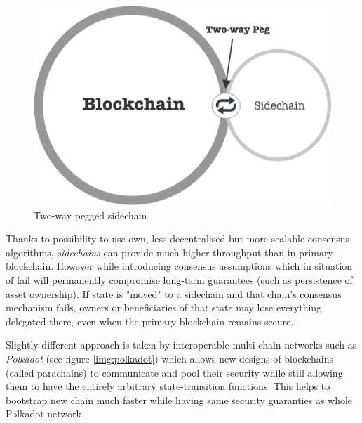 \documentclass[a4paper,12pt]{article}
\begin{document}
\begin{figure}[H]
    \centering
    \includegraphics[scale=0.5]{../img/sidechain}
    \caption{Two-way pegged sidechain}
    \label{img:sidechain}
\end{figure}

Thanks to possibility to use own, less decentralised but more scalable consensus
algorithms, \textit{sidechains} can provide much higher throughput than in 
primary blockchain. However while introducing consensus assumptions which in 
situation of fail will permanently compromise long-term guarantees (such as 
persistence of asset ownership). If state is "moved" to a sidechain and that 
chain's consensus mechanism fails, owners or beneficiaries of that state may 
lose everything delegated there, even when the primary blockchain remains
secure.

Slightly different approach is taken by interoperable multi-chain networks such 
as \textit{Polkadot} (see figure \ref{img:polkadot}) which allows new designs of
blockchains (called parachains) to communicate and pool their security while 
still allowing them to have the entirely arbitrary state-transition functions. 
This helps to bootstrap new chain much faster while having same security 
guaranties as whole Polkadot network.
\end{document}
